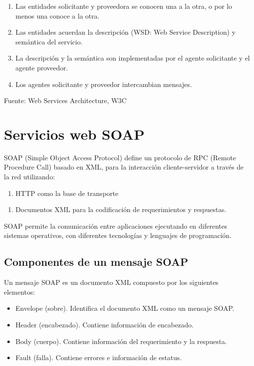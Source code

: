 \begin{enumerate}
\item Las entidades solicitante y proveedora se conocen una a la otra, o por lo menos una conoce a la otra.
\item Las entidades acuerdan la descripción (WSD: Web Service Description) y semántica del servicio.
\item La descripción y la semántica son implementadas por el agente solicitante y el agente proveedor.
\item Los agentes solicitante y proveedor intercambian mensajes.
\end{enumerate}

Fuente: Web Services Architecture, W3C

\section{Servicios web SOAP}

SOAP (Simple Object Access Protocol) define un protocolo de RPC (Remote Procedure Call) basado en XML, para la interacción cliente-servidor a través de la red utilizando:

\begin{enumerate}
\item HTTP como la base de transporte
\end{enumerate}

\begin{enumerate}
\item Documentos XML para la codificación de requerimientos y respuestas.
\end{enumerate}

SOAP permite la comunicación entre aplicaciones ejecutando en diferentes sistemas operativos, con diferentes tecnologías y lenguajes de programación.

\subsection{Componentes de un mensaje SOAP}

Un mensaje SOAP es un documento XML compuesto por los siguientes elementos:

\begin{itemize}
\item Envelope (sobre). Identifica el documento XML como un mensaje SOAP.
\item Header (encabezado). Contiene información de encabezado.
\item Body (cuerpo). Contiene información del requerimiento y la respuesta.
\item Fault (falla). Contiene errores e información de estatus.
\end{itemize}

